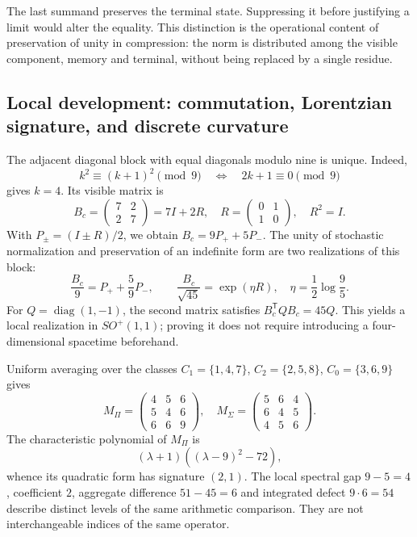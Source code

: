 The last summand preserves the terminal state. Suppressing it before justifying a limit would alter the equality. This distinction is the operational content of preservation of unity in compression: the norm is distributed among the visible component, memory and terminal, without being replaced by a single residue.

\subsection{Local development: commutation, Lorentzian signature, and discrete curvature}
\label{x_reciprocidad:vii:sec:bloque-compresion}
\label{x_reciprocidad:iv:extension-curvatura-mixta}

The adjacent diagonal block with equal diagonals modulo nine is unique. Indeed,
\[
 k^2\equiv(k+1)^2\pmod9\quad\Longleftrightarrow\quad2k+1\equiv0\pmod9
\]
gives \(k=4\). Its visible matrix is
\[
 B_c=\begin{pmatrix}7&2\\2&7\end{pmatrix}=7I+2R,
 \quad R=\begin{pmatrix}0&1\\1&0\end{pmatrix},\quad R^2=I.
\]
With \(P_\pm=(I\pm R)/2\), we obtain \(B_c=9P_++5P_-\). The unity of stochastic normalization and preservation of an indefinite form are two realizations of this block:
\[
 \frac{B_c}{9}=P_++\frac59P_-,\qquad
 \frac{B_c}{\sqrt{45}}=\exp(\eta R),\quad\eta=\frac12\log\frac95.
\]
For \(Q=\operatorname{diag}(1,-1)\), the second matrix satisfies \(B_c^{\mathsf T}QB_c=45Q\). This yields a local realization in \(SO^+(1,1)\); proving it does not require introducing a four-dimensional spacetime beforehand.

Uniform averaging over the classes \(C_1=\{1,4,7\}\), \(C_2=\{2,5,8\}\), \(C_0=\{3,6,9\}\) gives
\[
 M_\Pi=\begin{pmatrix}4&5&6\\5&4&6\\6&6&9\end{pmatrix},\quad
 M_\Sigma=\begin{pmatrix}5&6&4\\6&4&5\\4&5&6\end{pmatrix}.
\]
The characteristic polynomial of \(M_\Pi\) is
\[
 (\lambda+1)((\lambda-9)^2-72),
\]
whence its quadratic form has signature \((2,1)\). The local spectral gap \(9-5=4\), coefficient \(2\), aggregate difference \(51-45=6\) and integrated defect \(9\cdot6=54\) describe distinct levels of the same arithmetic comparison. They are not interchangeable indices of the same operator.

